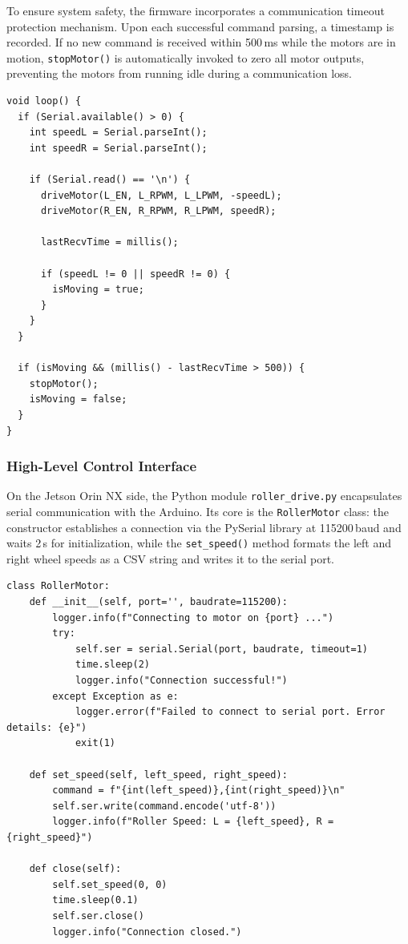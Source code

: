 To ensure system safety, the firmware incorporates a communication timeout protection mechanism. Upon each successful command parsing, a timestamp is recorded. If no new command is received within 500\,ms while the motors are in motion, \texttt{stopMotor()} is automatically invoked to zero all motor outputs, preventing the motors from running idle during a communication loss.

\begin{verbatim}
void loop() {
  if (Serial.available() > 0) {
    int speedL = Serial.parseInt();
    int speedR = Serial.parseInt();

    if (Serial.read() == '\n') {
      driveMotor(L_EN, L_RPWM, L_LPWM, -speedL);
      driveMotor(R_EN, R_RPWM, R_LPWM, speedR);

      lastRecvTime = millis();

      if (speedL != 0 || speedR != 0) {
        isMoving = true;
      }
    }
  }

  if (isMoving && (millis() - lastRecvTime > 500)) {
    stopMotor();
    isMoving = false;
  }
}
\end{verbatim}

\subsubsection{High-Level Control Interface}
\label{sec:motor_python}

On the Jetson Orin NX side, the Python module \texttt{roller\_drive.py} encapsulates serial communication with the Arduino. Its core is the \texttt{RollerMotor} class: the constructor establishes a connection via the PySerial library at 115200\,baud and waits 2\,s for initialization, while the \texttt{set\_speed()} method formats the left and right wheel speeds as a CSV string and writes it to the serial port.

\begin{verbatim}
class RollerMotor:
    def __init__(self, port='', baudrate=115200):
        logger.info(f"Connecting to motor on {port} ...")
        try:
            self.ser = serial.Serial(port, baudrate, timeout=1)
            time.sleep(2)
            logger.info("Connection successful!")
        except Exception as e:
            logger.error(f"Failed to connect to serial port. Error details: {e}")
            exit(1)

    def set_speed(self, left_speed, right_speed):
        command = f"{int(left_speed)},{int(right_speed)}\n"
        self.ser.write(command.encode('utf-8'))
        logger.info(f"Roller Speed: L = {left_speed}, R = {right_speed}")

    def close(self):
        self.set_speed(0, 0)
        time.sleep(0.1)
        self.ser.close()
        logger.info("Connection closed.")
\end{verbatim}

